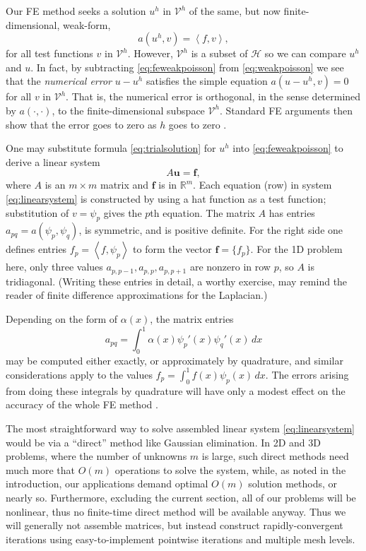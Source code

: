 \documentclass[letterpaper,final,12pt,reqno]{amsart}
\theoremstyle{claim}
\newcommand{\RR}{\mathbb{R}}
\newcommand{\bbf}{\mathbf{f}}
\newcommand{\bu}{\mathbf{u}}
\newcommand{\ip}[2]{\left<#1,#2\right>}
\numberwithin{equation}{section}
\numberwithin{figure}{section}
\numberwithin{table}{section}
\numberwithin{theorem}{section}
\begin{document}
Our FE method seeks a solution $u^h$ in $\mathcal{V}^h$ of the same, but now finite-dimensional, weak-form,
\begin{equation}
  a(u^h,v) = \ip{f}{v},  \label{eq:feweakpoisson}
\end{equation}
for all test functions $v$ in $\mathcal{V}^h$.  However, $\mathcal{V}^h$ is a subset of $\mathcal{H}$ so we can compare $u^h$ and $u$.  In fact, by subtracting \eqref{eq:feweakpoisson} from \eqref{eq:weakpoisson} we see that the \emph{numerical error} $u-u^h$ satisfies the simple equation $a(u-u^h,v)=0$ for all $v$ in $\mathcal{V}^h$.  That is, the numerical error is orthogonal, in the sense determined by $a(\cdot,\cdot)$, to the finite-dimensional subspace $\mathcal{V}^h$.  Standard FE arguments then show that the error goes to zero as $h$ goes to zero \cite{Braess2007,Elmanetal2014}.

One may substitute formula \eqref{eq:trialsolution} for $u^h$ into \eqref{eq:feweakpoisson} to derive a linear system
\begin{equation}
A \bu = \bbf, \label{eq:linearsystem}
\end{equation}
where $A$ is an $m\times m$ matrix and $\bbf$ is in $\RR^m$.  Each equation (row) in system \eqref{eq:linearsystem} is constructed by using a hat function as a test function; substitution of $v=\psi_p$ gives the $p$th equation.  The matrix $A$ has entries $a_{pq} = a(\psi_p,\psi_q)$, is symmetric, and is positive definite.  For the right side one defines entries $f_p = \ip{f}{\psi_p}$ to form the vector $\bbf = \{f_p\}$.  For the 1D problem here, only three values $a_{p,p-1}, a_{p,p}, a_{p,p+1}$ are nonzero in row $p$, so $A$ is tridiagonal.  (Writing these entries in detail, a worthy exercise, may remind the reader of finite difference approximations for the Laplacian.)

Depending on the form of $\alpha(x)$, the matrix entries
\begin{equation}
  a_{pq} = \int_0^1 \alpha(x) \psi_p'(x) \psi_q'(x)\,dx \label{eq:poissonentries}
\end{equation}
may be computed either exactly, or approximately by quadrature, and similar considerations apply to the values $f_p = \int_0^1 f(x) \psi_p(x)\,dx$.  The errors arising from doing these integrals by quadrature will have only a modest effect on the accuracy of the whole FE method \cite{Braess2007}.

The most straightforward way to solve assembled linear system \eqref{eq:linearsystem} would be via a ``direct'' method like Gaussian elimination.  In 2D and 3D problems, where the number of unknowns $m$ is large, such direct methods need much more that $O(m)$ operations to solve the system, while, as noted in the introduction, our applications demand optimal $O(m)$ solution methods, or nearly so.  Furthermore, excluding the current section, all of our problems will be nonlinear, thus no finite-time direct method will be available anyway.  Thus we will generally not assemble matrices, but instead construct rapidly-convergent iterations using easy-to-implement pointwise iterations and multiple mesh levels.
\end{document}
